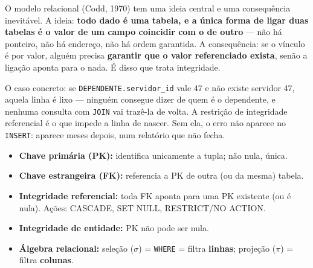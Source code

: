 O modelo relacional (Codd, 1970) tem uma ideia central e uma consequência
inevitável. A ideia: \textbf{todo dado é uma tabela, e a única forma de ligar
duas tabelas é o valor de um campo coincidir com o de outro} --- não há
ponteiro, não há endereço, não há ordem garantida. A consequência: se o
vínculo é por valor, alguém precisa \textbf{garantir que o valor referenciado
exista}, senão a ligação aponta para o nada. É disso que trata integridade.

O caso concreto: se \texttt{DEPENDENTE.servidor\_id} vale 47 e não existe
servidor 47, aquela linha é lixo --- ninguém consegue dizer de quem é o
dependente, e nenhuma consulta com \texttt{JOIN} vai trazê-la de volta. A
restrição de integridade referencial é o que impede a linha de nascer. Sem
ela, o erro não aparece no \texttt{INSERT}: aparece meses depois, num
relatório que não fecha.

\begin{itemize}
\item \textbf{Chave primária (PK):} identifica unicamente a tupla; não nula,
única.
\item \textbf{Chave estrangeira (FK):} referencia a PK de outra (ou da
mesma) tabela.
\item \textbf{Integridade referencial:} toda FK aponta para uma PK
existente (ou é nula). Ações: CASCADE, SET NULL, RESTRICT/NO ACTION.
\item \textbf{Integridade de entidade:} PK não pode ser nula.
\item \textbf{Álgebra relacional:} seleção ($\sigma$) = \texttt{WHERE} =
filtra \textbf{linhas}; projeção ($\pi$) = filtra \textbf{colunas}.
\end{itemize}

